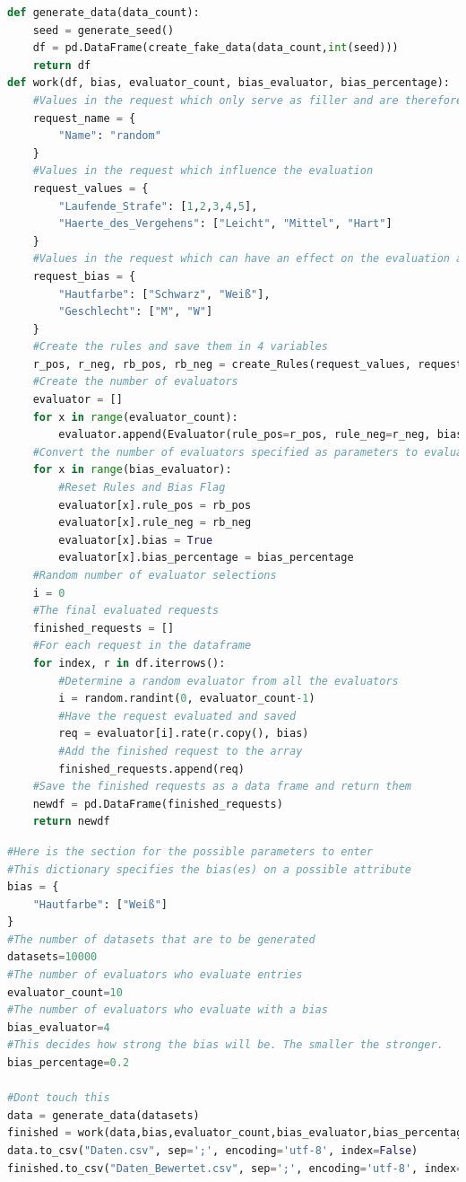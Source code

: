 \documentclass[a4paper,12pt]{report}
\begin{document}
\begin{lstlisting}[language=Python,label={lst:Sz1Z7},caption=Siebte Zelle Methode zum Daten erstellen und Methode für den gesamt Ablauf]
def generate_data(data_count):
    seed = generate_seed()
    df = pd.DataFrame(create_fake_data(data_count,int(seed)))
    return df
def work(df, bias, evaluator_count, bias_evaluator, bias_percentage):
    #Values in the request which only serve as filler and are therefore irrelevant
    request_name = {
        "Name": "random"
    }
    #Values in the request which influence the evaluation
    request_values = {
        "Laufende_Strafe": [1,2,3,4,5],
        "Haerte_des_Vergehens": ["Leicht", "Mittel", "Hart"]
    }
    #Values in the request which can have an effect on the evaluation as a bias
    request_bias = {
        "Hautfarbe": ["Schwarz", "Weiß"],
        "Geschlecht": ["M", "W"]
    }
    #Create the rules and save them in 4 variables
    r_pos, r_neg, rb_pos, rb_neg = create_Rules(request_values, request_bias, bias)
    #Create the number of evaluators
    evaluator = []
    for x in range(evaluator_count):
        evaluator.append(Evaluator(rule_pos=r_pos, rule_neg=r_neg, bias=False))
    #Convert the number of evaluators specified as parameters to evaluators with a bias
    for x in range(bias_evaluator):
        #Reset Rules and Bias Flag
        evaluator[x].rule_pos = rb_pos
        evaluator[x].rule_neg = rb_neg
        evaluator[x].bias = True
        evaluator[x].bias_percentage = bias_percentage
    #Random number of evaluator selections
    i = 0
    #The final evaluated requests
    finished_requests = []
    #For each request in the dataframe
    for index, r in df.iterrows():
        #Determine a random evaluator from all the evaluators
        i = random.randint(0, evaluator_count-1)
        #Have the request evaluated and saved
        req = evaluator[i].rate(r.copy(), bias)
        #Add the finished request to the array
        finished_requests.append(req)
    #Save the finished requests as a data frame and return them
    newdf = pd.DataFrame(finished_requests)
    return newdf
\end{lstlisting}
\begin{lstlisting}[language=Python,label={lst:Sz1Z8},caption=Achte Zelle für die Interaktion der benutzenden Person]
#Here is the section for the possible parameters to enter
#This dictionary specifies the bias(es) on a possible attribute
bias = {
    "Hautfarbe": ["Weiß"]
}
#The number of datasets that are to be generated
datasets=10000
#The number of evaluators who evaluate entries
evaluator_count=10
#The number of evaluators who evaluate with a bias
bias_evaluator=4
#This decides how strong the bias will be. The smaller the stronger.
bias_percentage=0.2

#Dont touch this
data = generate_data(datasets)
finished = work(data,bias,evaluator_count,bias_evaluator,bias_percentage)
data.to_csv("Daten.csv", sep=';', encoding='utf-8', index=False)
finished.to_csv("Daten_Bewertet.csv", sep=';', encoding='utf-8', index=False)
\end{lstlisting}
\end{document}
